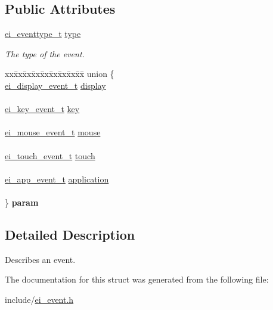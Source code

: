 \subsection*{Public Attributes}
\begin{DoxyCompactItemize}
\item 
\mbox{\label{structei__event__t_aee18f11986ed603959de628558812c58}} 
\hyperlink{ei__event_8h_a132dde064150d861ad24e9d839cbe007}{ei\+\_\+eventtype\+\_\+t} \hyperlink{structei__event__t_aee18f11986ed603959de628558812c58}{type}
\begin{DoxyCompactList}\small\item\em The type of the event. \end{DoxyCompactList}\item 
\mbox{\label{structei__event__t_a03a01773dff790d4b772f6b16e4fbb4b}} 
\begin{tabbing}
xx\=xx\=xx\=xx\=xx\=xx\=xx\=xx\=xx\=\kill
union \{\\
\>\hyperlink{structei__display__event__t}{ei\_display\_event\_t} \hyperlink{structei__event__t_aa0c523780572b4ea92fb3f9a016f6c04}{display}\\
\>\\
\>\hyperlink{structei__key__event__t}{ei\_key\_event\_t} \hyperlink{structei__event__t_a0f146bb41b78f27e18ecccc71f50026d}{key}\\
\>\\
\>\hyperlink{structei__mouse__event__t}{ei\_mouse\_event\_t} \hyperlink{structei__event__t_a7f0b0d0cf765a822aca7a435510d9d85}{mouse}\\
\>\\
\>\hyperlink{structei__touch__event__t}{ei\_touch\_event\_t} \hyperlink{structei__event__t_a8f3c33a53f2738bd153c923b3a6ad20d}{touch}\\
\>\\
\>\hyperlink{structei__app__event__t}{ei\_app\_event\_t} \hyperlink{structei__event__t_ab93b7dc04597613a3bd0195e74a9f7bb}{application}\\
\>\\
\} {\bfseries param}\\

\end{tabbing}\end{DoxyCompactItemize}


\subsection{Detailed Description}
Describes an event. 

The documentation for this struct was generated from the following file\+:\begin{DoxyCompactItemize}
\item 
include/\hyperlink{ei__event_8h}{ei\+\_\+event.\+h}\end{DoxyCompactItemize}
